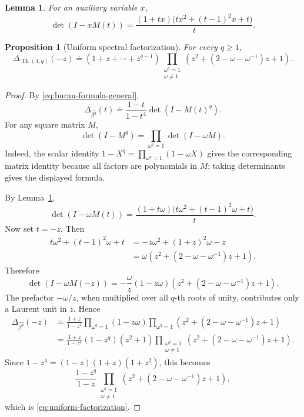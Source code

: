 \documentclass[10pt,a4paper]{amsart}
\newtheorem{lemma}{Lemma}
\newtheorem{proposition}{Proposition}
\newcommand{\Th}{\operatorname{Th}}
\newcommand{\dd}{\doteq}
\begin{document}
\begin{lemma}\label{lem:det-I-xM}
For an auxiliary variable \(x\),
\begin{equation}\label{eq:det-I-xM}
        \det(I-xM(t))
        =\frac{(1+tx)\bigl(tx^2+(t-1)^2x+t\bigr)}{t}.
\end{equation}
\end{lemma}

\begin{proposition}[Uniform spectral factorization]\label{prop:uniform-factorization}
For every \(q\ge1\),
\begin{equation}\label{eq:uniform-factorization}
        \Delta_{\Th(4,q)}(-z)
        \dd
        (1+z+\cdots+z^{q-1})
        \prod_{\substack{\omega^q=1\\ \omega\ne1}}
        \left(z^2+(2-\omega-\omega^{-1})z+1\right).
\end{equation}
\end{proposition}

\begin{proof}
By \eqref{eq:burau-formula-general},
\[
        \Delta_{\widehat{\beta^q}}(t)
        \dd
        \frac{1-t}{1-t^4}\det(I-M(t)^q).
\]
For any square matrix \(M\),
\[
        \det(I-M^q)=\prod_{\omega^q=1}\det(I-\omega M).
\]
Indeed, the scalar identity \(1-X^q=\prod_{\omega^q=1}(1-\omega X)\) gives the corresponding matrix identity because all factors are polynomials in \(M\); taking determinants gives the displayed formula.

By Lemma~\ref{lem:det-I-xM},
\[
        \det(I-\omega M(t))
        =\frac{(1+t\omega)\bigl(t\omega^2+(t-1)^2\omega+t\bigr)}{t}.
\]
Now set \(t=-z\).  Then
\[
\begin{aligned}
        t\omega^2+(t-1)^2\omega+t
        &=-z\omega^2+(1+z)^2\omega-z  \\
        &=\omega\left(z^2+(2-\omega-\omega^{-1})z+1\right).
\end{aligned}
\]
Therefore
\begin{equation}\label{eq:single-root-factor}
        \det(I-\omega M(-z))
        =-\frac{\omega}{z}(1-z\omega)
        \left(z^2+(2-\omega-\omega^{-1})z+1\right).
\end{equation}
The prefactor \(-\omega/z\), when multiplied over all \(q\)-th roots of unity, contributes only a Laurent unit in \(z\).  Hence
\[
\begin{aligned}
\Delta_{\widehat{\beta^q}}(-z)
&\dd
\frac{1+z}{1-z^4}
\prod_{\omega^q=1}(1-z\omega)
\prod_{\omega^q=1}
\left(z^2+(2-\omega-\omega^{-1})z+1\right)  \\
&=
\frac{1+z}{1-z^4}(1-z^q)(z^2+1)
\prod_{\substack{\omega^q=1\\ \omega\ne1}}
\left(z^2+(2-\omega-\omega^{-1})z+1\right).
\end{aligned}
\]
Since \(1-z^4=(1-z)(1+z)(1+z^2)\), this becomes
\[
        \frac{1-z^q}{1-z}
        \prod_{\substack{\omega^q=1\\ \omega\ne1}}
        \left(z^2+(2-\omega-\omega^{-1})z+1\right),
\]
which is \eqref{eq:uniform-factorization}.
\end{proof}
\end{document}
